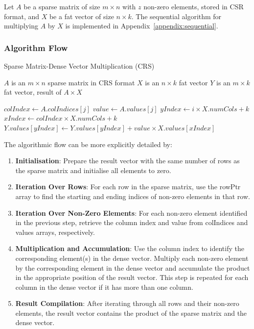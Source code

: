 \documentclass[12pt,oneside]{book} %
\begin{document}
Let \( A \) be a sparse matrix of size \( m \times n \) with \( z \) non-zero
elements, stored in CSR format, and \( X \) be a fat vector of size \( n \times
k \). The sequential algorithm for multiplying \( A \) by \( X \) is
implemented in Appendix~\ref{appendix:sequential}.

\subsubsection{Algorithm Flow}

\begin{algorithm}[H]
    \caption{Sparse Matrix-Dense Vector Multiplication (CRS)}
    \begin{algorithmic}
        \Require $A$ is an $m \times n$ sparse matrix in CRS format
        \Require $X$ is an $n \times k$ fat vector
        \Ensure  $Y$ is an $m \times k$ fat vector, result of $A \times X$

        \State $colIndex \gets A.colIndices[j]$
        \State $value \gets A.values[j]$
        \State $yIndex \gets i \times X.numCols + k$
        \State $xIndex \gets colIndex \times X.numCols + k$
        \State $Y.values[yIndex] \gets Y.values[yIndex] + value \times X.values[xIndex]$
        \EndFor
        \EndFor
        \EndFor
    \end{algorithmic}
\end{algorithm}

The algorithmic flow can be more explicitly detailed by:
\begin{enumerate}
    \item \textbf{Initialisation}: Prepare the result vector with the same number of rows as the sparse matrix and initialise all elements to zero.
    \item \textbf{Iteration Over Rows}: For each row in the sparse matrix, use the rowPtr array to find the starting and ending indices of non-zero elements in that row.
    \item \textbf{Iteration Over Non-Zero Elements}: For each non-zero element identified in the previous step, retrieve the column index and value from colIndices and values arrays, respectively.
    \item \textbf{Multiplication and Accumulation}: Use the column index to identify the corresponding element(s) in the dense vector. Multiply each non-zero element by the corresponding element in the dense vector and accumulate the product in the appropriate position of the result vector. This step is repeated for each column in the dense vector if it has more than one column.
    \item \textbf{Result Compilation}: After iterating through all rows and their non-zero elements, the result vector contains the product of the sparse matrix and the dense vector.
\end{enumerate}
\end{document}
